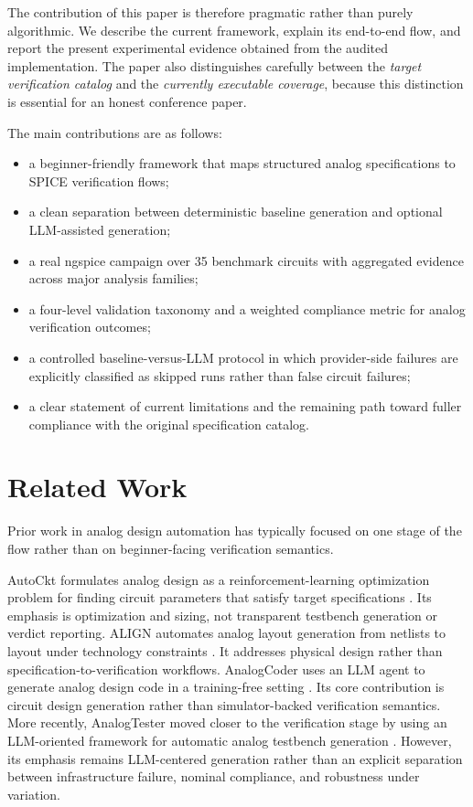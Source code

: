 \documentclass[conference]{IEEEtran}
\begin{document}
The contribution of this paper is therefore pragmatic rather than purely algorithmic. We describe the current framework, explain its end-to-end flow, and report the present experimental evidence obtained from the audited implementation. The paper also distinguishes carefully between the \emph{target verification catalog} and the \emph{currently executable coverage}, because this distinction is essential for an honest conference paper.

The main contributions are as follows:

\begin{itemize}
\item a beginner-friendly framework that maps structured analog specifications to SPICE verification flows;
\item a clean separation between deterministic baseline generation and optional LLM-assisted generation;
\item a real ngspice campaign over 35 benchmark circuits with aggregated evidence across major analysis families;
\item a four-level validation taxonomy and a weighted compliance metric for analog verification outcomes;
\item a controlled baseline-versus-LLM protocol in which provider-side failures are explicitly classified as skipped runs rather than false circuit failures;
\item a clear statement of current limitations and the remaining path toward fuller compliance with the original specification catalog.
\end{itemize}

\section{Related Work}
Prior work in analog design automation has typically focused on one stage of the flow rather than on beginner-facing verification semantics.

AutoCkt formulates analog design as a reinforcement-learning optimization problem for finding circuit parameters that satisfy target specifications \cite{settaluri2020autockt}. Its emphasis is optimization and sizing, not transparent testbench generation or verdict reporting. ALIGN automates analog layout generation from netlists to layout under technology constraints \cite{dhar2020align}. It addresses physical design rather than specification-to-verification workflows. AnalogCoder uses an LLM agent to generate analog design code in a training-free setting \cite{lai2024analogcoder}. Its core contribution is circuit design generation rather than simulator-backed verification semantics. More recently, AnalogTester moved closer to the verification stage by using an LLM-oriented framework for automatic analog testbench generation \cite{chen2025analogtester}. However, its emphasis remains LLM-centered generation rather than an explicit separation between infrastructure failure, nominal compliance, and robustness under variation.
\end{document}
